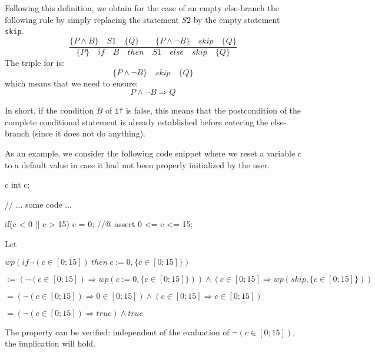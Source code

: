 

Following this definition, we obtain for the case of an empty else-branch the
following rule by simply replacing the statement $S2$ by the empty
statement \texttt{skip}.
$$\dfrac{\{P \wedge B\}\quad S1\quad \{Q\} \quad \quad \{P \wedge \neg B\}\quad skip\quad \{Q\}}{\{P\}\quad if\quad B\quad then\quad S1\quad else\quad skip \quad \{Q\}}$$
The triple for  is:
$$\{P \wedge \neg B\}\quad skip\quad \{Q\}$$
which means that we need to ensure:
$$P \wedge \neg B \Rightarrow Q$$

In short, if the condition $B$ of \texttt{if} is false, this means
that the postcondition of the complete conditional statement is already
established before entering the else-branch (since it does not do
anything).



As an example, we consider the following code snippet where we reset a
variable $c$ to a default value in case it had not been properly
initialized by the user.



\begin{CodeBlock}{c}
int c;

// ... some code ...

if(c < 0 || c > 15){
  c = 0;
}
//@ assert 0 <= c <= 15;
\end{CodeBlock}



Let



$wp(if \neg (c \in [0;15])\ then\ c := 0, \{c \in [0;15]\})$



$:= (\neg (c \in [0;15])\Rightarrow wp(c := 0, \{c \in [0;15]\})) \wedge (c \in [0;15]\Rightarrow wp(skip, \{c \in [0;15]\}))$



$= (\neg (c \in [0;15]) \Rightarrow 0 \in [0;15]) \wedge (c \in [0;15] \Rightarrow c \in [0;15])$



$= (\neg (c \in [0;15]) \Rightarrow true) \wedge true$



The property can be verified: independent of the evaluation of
$\neg (c \in [0;15])$, the implication will hold.



\label{l3:statements-basic-consequence}


